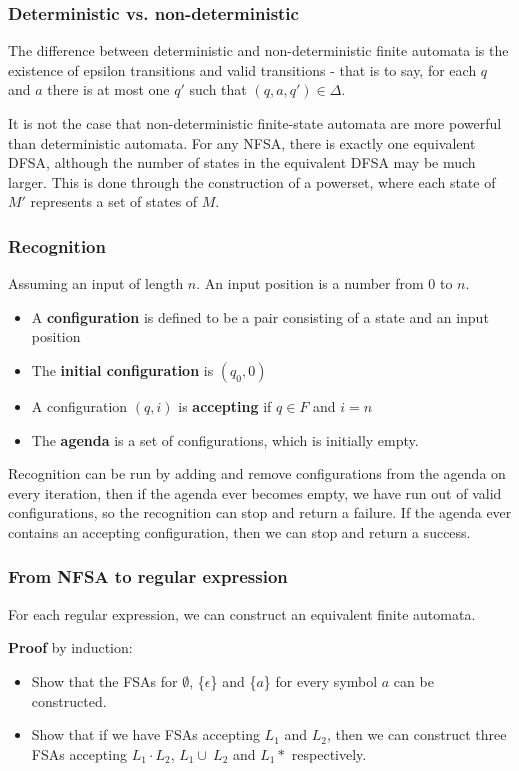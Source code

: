 \documentclass[Report.tex]{subfiles}
\begin{document}
\subsubsection{Deterministic vs. non-deterministic}
The difference between deterministic and non-deterministic finite automata
is the existence of epsilon transitions and valid transitions - that is
to say, for each $q$ and $a$ there is at most one $q'$ such that
$(q, a, q') \in \Delta$.

It is not the case that non-deterministic finite-state automata are more
powerful than deterministic automata. For any NFSA, there is exactly one
equivalent DFSA, although the number of states in the equivalent DFSA
may be much larger. This is done through the construction of a 
powerset, where each state of $M'$ represents a set of states of $M$.

\subsubsection{Recognition}
Assuming an input of length $n$. An input position is a number from 0 to $n$.
\begin{itemize}
\item A \textbf{configuration} is defined to be a pair consisting
of a state and an input position
\item The \textbf{initial configuration} is $(q_0, 0)$
\item A configuration $(q, i)$ is \textbf{accepting} if $q \in F$ and $i = n$
\item The \textbf{agenda} is a set of configurations, which is initially empty.
\end{itemize}
Recognition can be run by adding and remove configurations from the agenda on
every iteration, then if the agenda ever becomes empty, we have run out
of valid configurations, so the recognition can stop and return a failure.
If the agenda ever contains an accepting configuration, then we can stop
and return a success.

\subsubsection{From NFSA to regular expression}
For each regular expression, we can construct an equivalent finite automata.

\textbf{Proof} by induction:
\begin{itemize}
\item Show that the FSAs for $\emptyset$, \{$\epsilon$\} and \{$a$\} for 
every symbol $a$ can be constructed.
\item Show that if we have FSAs accepting $L_1$ and $L_2$, then we can
construct three FSAs accepting $L_1 \cdot L_2$, $L_1 \cup\ L_2$ and $L_1 *$
respectively.
\end{itemize}
\end{document}
